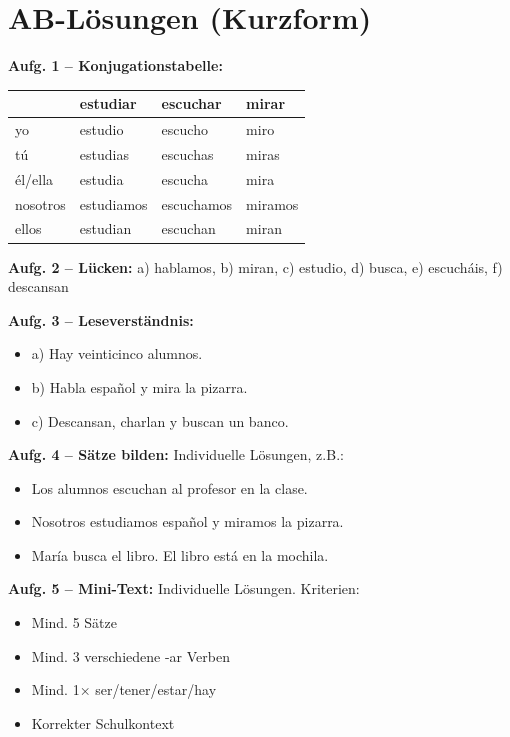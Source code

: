 \documentclass[11pt,a4paper]{article}
\begin{document}
\vspace{0.5cm}

\section*{AB-Lösungen (Kurzform)}

\textbf{Aufg. 1 -- Konjugationstabelle:}

\begin{tabular}{l|lll}
 & estudiar & escuchar & mirar \\
\hline
yo & estudio & escucho & miro \\
tú & estudias & escuchas & miras \\
él/ella & estudia & escucha & mira \\
nosotros & estudiamos & escuchamos & miramos \\
ellos & estudian & escuchan & miran \\
\end{tabular}

\vspace{0.3cm}

\textbf{Aufg. 2 -- Lücken:}
a) hablamos, b) miran, c) estudio, d) busca, e) escucháis, f) descansan

\vspace{0.3cm}

\textbf{Aufg. 3 -- Leseverständnis:}
\begin{itemize}[nosep]
    \item a) Hay veinticinco alumnos.
    \item b) Habla español y mira la pizarra.
    \item c) Descansan, charlan y buscan un banco.
\end{itemize}

\vspace{0.3cm}

\textbf{Aufg. 4 -- Sätze bilden:} Individuelle Lösungen, z.B.:
\begin{itemize}[nosep]
    \item Los alumnos escuchan al profesor en la clase.
    \item Nosotros estudiamos español y miramos la pizarra.
    \item María busca el libro. El libro está en la mochila.
\end{itemize}

\vspace{0.3cm}

\textbf{Aufg. 5 -- Mini-Text:} Individuelle Lösungen. Kriterien:
\begin{itemize}[nosep]
    \item Mind. 5 Sätze
    \item Mind. 3 verschiedene -ar Verben
    \item Mind. 1× ser/tener/estar/hay
    \item Korrekter Schulkontext
\end{itemize}

\vspace{0.5cm}
\end{document}
